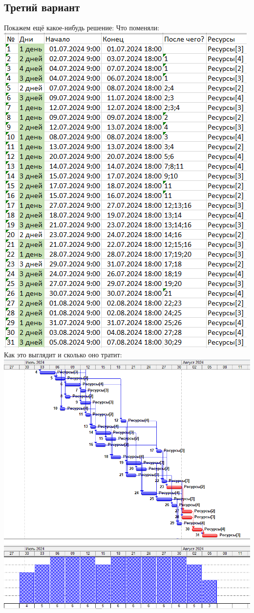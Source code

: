 \documentclass[14pt]{article}
\begin{document}
	\subsection{Третий вариант}
		Покажем ещё какое-нибудь решение:
		{\LARGE Что поменяли:}\\
		\includegraphics[height=0.6\textheight]{../img/1a3_days_change.png}\\ 
		{\LARGE Как это выглядит и сколько оно тратит:}\\
		\includegraphics[width=\textwidth]{../img/1a3_answer.png}\\ 
\end{document}
